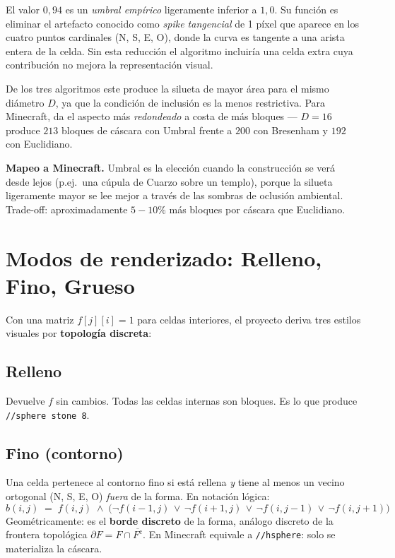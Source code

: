 \documentclass[12pt,a4paper]{scrartcl}
\newcommand{\acc}[1]{\textcolor{accent}{\textbf{#1}}}
\newcommand{\cmd}[1]{\textcolor{earth}{\texttt{\small #1}}}
\begin{document}
El valor \acc{$0{,}94$} es un \emph{umbral empírico} ligeramente inferior a $1{,}0$. Su función es eliminar el artefacto conocido como \emph{spike tangencial} de 1 píxel que aparece en los cuatro puntos cardinales (N, S, E, O), donde la curva es tangente a una arista entera de la celda. Sin esta reducción el algoritmo incluiría una celda extra cuya contribución no mejora la representación visual.

De los tres algoritmos este produce la silueta de mayor área para el mismo diámetro $D$, ya que la condición de inclusión es la menos restrictiva. Para Minecraft, da el aspecto más \emph{redondeado} a costa de más bloques --- $D=16$ produce $213$ bloques de cáscara con Umbral frente a $200$ con Bresenham y $192$ con Euclidiano.

\begin{minec}
\textbf{Mapeo a Minecraft.} Umbral es la elección cuando la construcción se verá desde lejos (p.ej.\ una cúpula de Cuarzo sobre un templo), porque la silueta ligeramente mayor se lee mejor a través de las sombras de oclusión ambiental. Trade-off: aproximadamente $5{-}10\%$ más bloques por cáscara que Euclidiano.
\end{minec}

\section{Modos de renderizado: Relleno, Fino, Grueso}

Con una matriz $f[j][i] = 1$ para celdas interiores, el proyecto deriva tres estilos visuales por \acc{topología discreta}:

\subsection{Relleno}
Devuelve $f$ sin cambios. Todas las celdas internas son bloques. Es lo que produce \cmd{//sphere stone 8}.

\subsection{Fino (contorno)}
Una celda pertenece al contorno fino si está rellena \emph{y} tiene al menos un vecino ortogonal (N, S, E, O) \emph{fuera} de la forma. En notación lógica:
\[
b(i,j) \;=\; f(i,j) \;\wedge\;
\bigl(\neg f(i{-}1,j)\,\vee\,\neg f(i{+}1,j)\,\vee\,\neg f(i,j{-}1)\,\vee\,\neg f(i,j{+}1)\bigr)
\]
Geométricamente: es el \acc{borde discreto} de la forma, análogo discreto de la frontera topológica $\partial F = F \cap \overline{F^{\mathrm{c}}}$. En Minecraft equivale a \cmd{//hsphere}: solo se materializa la cáscara.
\end{document}
